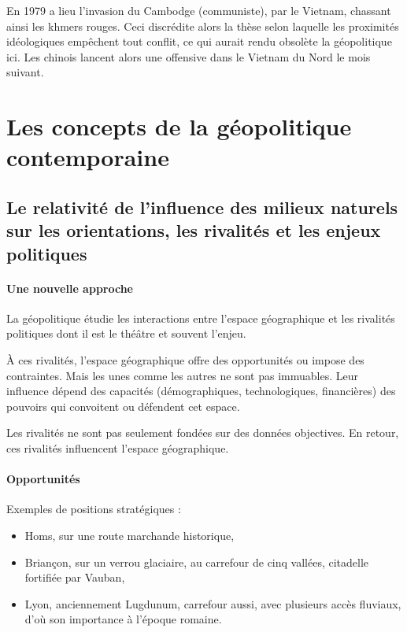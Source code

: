 \documentclass[a4paper,10pt]{article}
\begin{document}
		En 1979 a lieu l'invasion du Cambodge (communiste), par le Vietnam, chassant ainsi les khmers rouges.
		Ceci discrédite alors la thèse selon laquelle les proximités idéologiques empêchent tout conflit, ce qui aurait rendu obsolète la géopolitique ici.
		Les chinois lancent alors une offensive dans le Vietnam du Nord le mois suivant.

\section{Les concepts de la géopolitique contemporaine}

	\subsection{Le relativité de l'influence des milieux naturels sur les orientations, les rivalités et les enjeux politiques}

		\paragraph{Une nouvelle approche}

		La géopolitique étudie les interactions entre l'espace géographique et les rivalités politiques dont il est le théâtre et souvent l'enjeu.

		À ces rivalités, l'espace géographique offre des opportunités ou impose des contraintes.
		Mais les unes comme les autres ne sont pas immuables.
		Leur influence dépend des capacités (démographiques, technologiques, financières) des pouvoirs qui convoitent ou défendent cet espace.

		Les rivalités ne sont pas seulement fondées sur des données objectives.
		En retour, ces rivalités influencent l'espace géographique.

		\paragraph{Opportunités}

		Exemples de positions stratégiques :
		\begin{itemize}
		\item Homs, sur une route marchande historique,
		\item Briançon, sur un verrou glaciaire, au carrefour de cinq vallées, citadelle fortifiée par Vauban,
		\item Lyon, anciennement Lugdunum, carrefour aussi, avec plusieurs accès fluviaux, d'où son importance à l'époque romaine.
		\end{itemize}
\end{document}
